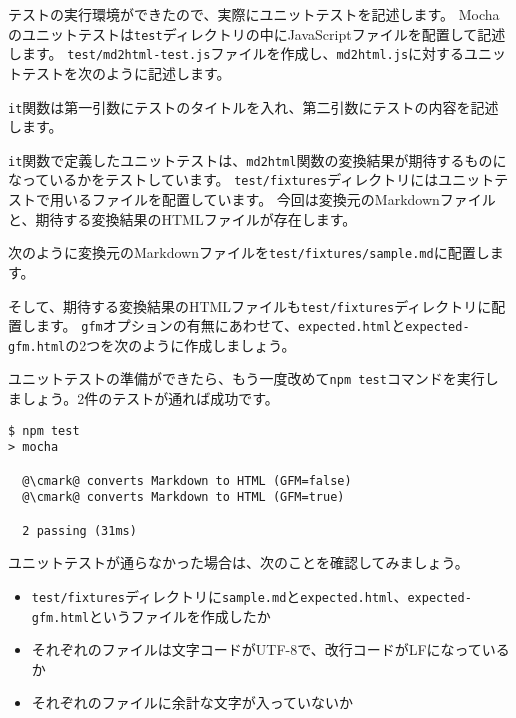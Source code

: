 テストの実行環境ができたので、実際にユニットテストを記述します。
Mochaのユニットテストは\texttt{test}ディレクトリの中にJavaScriptファイルを配置して記述します。
\texttt{test/md2html-test.js}ファイルを作成し、\texttt{md2html.js}に対するユニットテストを次のように記述します。

\texttt{it}関数は第一引数にテストのタイトルを入れ、第二引数にテストの内容を記述します。



\texttt{it}関数で定義したユニットテストは、\texttt{md2html}関数の変換結果が期待するものになっているかをテストしています。
\texttt{test/fixtures}ディレクトリにはユニットテストで用いるファイルを配置しています。
今回は変換元のMarkdownファイルと、期待する変換結果のHTMLファイルが存在します。

次のように変換元のMarkdownファイルを\texttt{test/fixtures/sample.md}に配置します。



そして、期待する変換結果のHTMLファイルも\texttt{test/fixtures}ディレクトリに配置します。
\texttt{gfm}オプションの有無にあわせて、\texttt{expected.html}と\texttt{expected-gfm.html}の2つを次のように作成しましょう。





ユニットテストの準備ができたら、もう一度改めて\texttt{npm test}コマンドを実行しましょう。2件のテストが通れば成功です。

\begin{lstlisting}[escapechar=@]
$ npm test
> mocha

  @\cmark@ converts Markdown to HTML (GFM=false)
  @\cmark@ converts Markdown to HTML (GFM=true)

  2 passing (31ms)
\end{lstlisting}

ユニットテストが通らなかった場合は、次のことを確認してみましょう。

\begin{itemize}
\item
  \texttt{test/fixtures}ディレクトリに\texttt{sample.md}と\texttt{expected.html}、\texttt{expected-gfm.html}というファイルを作成したか
\item
  それぞれのファイルは文字コードがUTF-8で、改行コードがLFになっているか
\item
  それぞれのファイルに余計な文字が入っていないか
\end{itemize}

